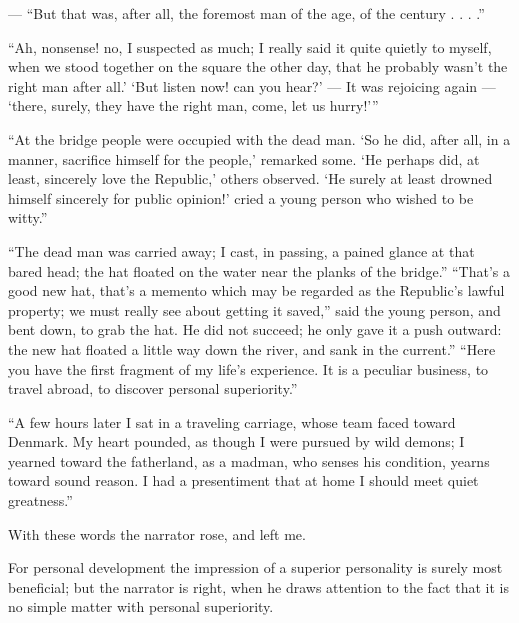 \documentclass[12pt,a4paper]{book}
\begin{document}
--- ``But that was, after all, the foremost man of the age, of the century . . . .''

``Ah, nonsense! no, I suspected as much; I really said it quite quietly to myself, when we stood together on the square the other day, that he probably wasn't the right man after all.' `But listen now! can you hear?' --- It was rejoicing again --- `there, surely, they have the right man, come, let us hurry!'''

``At the bridge people were occupied with the dead man. `So he did, after all, in a manner, sacrifice himself for the people,' remarked some. `He perhaps did, at least, sincerely love the Republic,' others observed. `He surely at least drowned himself sincerely for public opinion!' cried a young person who wished to be witty.''

``The dead man was carried away; I cast, in passing, a pained glance at that bared head; the hat floated on the water near the planks of the bridge.''
``That's a good new hat, that's a memento which may be regarded as the Republic's lawful property; we must really see about getting it saved,'' said the young person, and bent down, to grab the hat. He did not succeed; he only gave it a push outward: the new hat floated a little way down the river, and sank in the current.''
``Here you have the first fragment of my life's experience. It is a peculiar business, to travel abroad, to discover personal superiority.''

``A few hours later I sat in a traveling carriage, whose team faced toward Denmark. My heart pounded, as though I were pursued by wild demons; I yearned toward the fatherland, as a madman, who senses his condition, yearns toward sound reason. I had a presentiment that at home I should meet quiet greatness.''

With these words the narrator rose, and left me.

For personal development the impression of a superior personality is surely most beneficial; but the narrator is right, when he draws attention to the fact that it is no simple matter with personal superiority.
\end{document}
